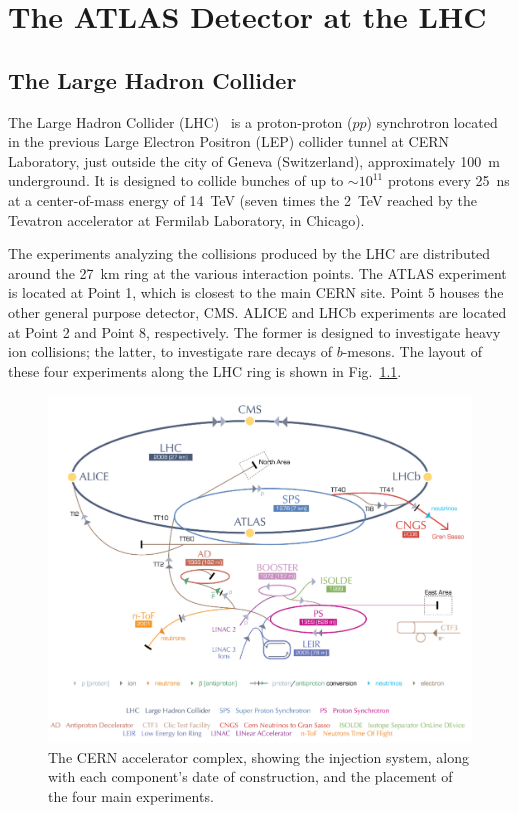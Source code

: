 %
%
\chapter{The ATLAS Detector at the LHC}\label{ch:lhc_atlas}

\section{The Large Hadron Collider}


The Large Hadron Collider  (LHC)~\cite{Breskin:1244506} is a proton-proton ($pp$) synchrotron located in the previous Large Electron Positron (LEP) collider tunnel at CERN Laboratory, just outside the city of Geneva (Switzerland), approximately 100~m underground. It is designed to collide bunches of up to $\sim 10^{11}$ protons every 25~ns at a center-of-mass energy of 14~TeV (seven times the 2~TeV reached by the Tevatron accelerator at Fermilab Laboratory, in Chicago). 

The experiments analyzing the collisions produced by the LHC are distributed around the 27~km ring at the various interaction points. The ATLAS experiment is located at Point 1, which is closest to the main CERN site. Point 5 houses the other general purpose detector, CMS. ALICE and LHCb experiments are located at Point 2 and Point 8, respectively. The former is designed to investigate heavy ion collisions; the latter, to investigate rare decays of $b$-mesons. The layout of these four experiments along the LHC ring is shown in Fig.~\ref{fig:LHC1}.

\begin{figure}[htbp]
  \begin{center}
      \includegraphics[width=1\textwidth]{Fig2/CERNacceleratorcomplexCut.pdf}
    \caption{The CERN accelerator complex, showing the injection system, along with each component's date of construction, and the placement of the four main experiments.}
    \label{fig:LHC1}
  \end{center}
\end{figure}


